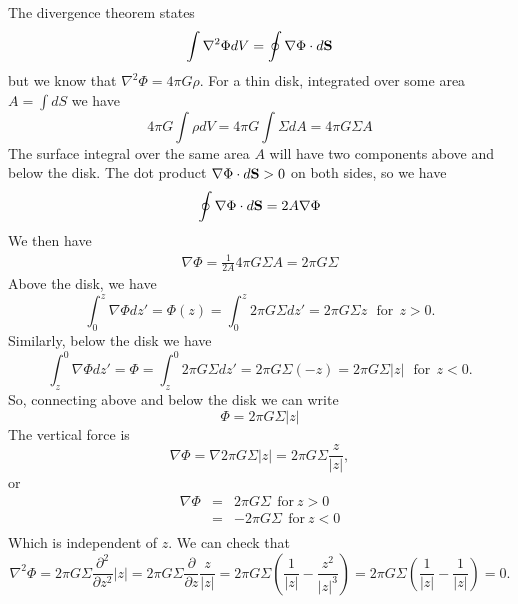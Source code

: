 \documentclass[]{article}
\begin{document}
The divergence theorem states
\begin{equation}
\int \nabla^2 \Phi dV = \oint \nabla \Phi \cdot d\mathbf{S}
\end{equation}
\noindent
but we know that $\nabla^2 \Phi = 4\pi G \rho$.
For a thin disk, integrated over some area $A = \int dS$ we have
\begin{equation}
4\pi G \int \rho dV = 4\pi G \int \Sigma dA = 4\pi G \Sigma A
\end{equation}
\noindent
The surface integral over the same area $A$ will have two
components above and below the disk.  The dot product
$\nabla \Phi \cdot d\mathbf{S}>0$ on both sides, so we have
\begin{equation}
\oint \nabla \Phi \cdot d\vS = 2 A \nabla \Phi %
\end{equation}
\noindent
We then have
\begin{eqnarray}
\nabla \Phi = \frac{1}{2A} 4 \pi G \Sigma A = 2\pi G \Sigma
\end{eqnarray}
\noindent
Above the disk, we have
\begin{equation}
\int_0^{z} \nabla \Phi dz' = \Phi(z) = \int_{0}^{z} 2\pi G \Sigma dz' = 2\pi G \Sigma z~~~\mathrm{for}~~z>0.
\end{equation}
Similarly, below the disk we have
\begin{equation}
\int_{z}^{0} \nabla \Phi dz' = \Phi = \int_{z}^{0} 2\pi G \Sigma dz' = 2\pi G \Sigma (-z) =2\pi G \Sigma|z|  ~~~\mathrm{for}~~z<0.
\end{equation}
\noindent
So, connecting above and below the disk we can write
\begin{equation}
\Phi = 2\pi G \Sigma|z| 
\end{equation}
\noindent
The vertical force is
\begin{equation}
\nabla \Phi = \nabla 2\pi G \Sigma|z| = 2 \pi G \Sigma \frac{z}{|z|},
\end{equation}
\noindent
or
\begin{eqnarray}
\nabla \Phi &=& 2\pi G \Sigma~~\mathrm{for}~z>0\\
&=& -2\pi G \Sigma~~\mathrm{for}~z<0\\
\end{eqnarray}
\noindent
Which is independent of $z$.
\noindent
We can check that
\begin{equation}
\nabla^2 \Phi = 2\pi G \Sigma \frac{\partial^2}{\partial z^2}|z| = 2\pi G \Sigma \frac{\partial}{\partial z}\frac{z}{|z|} = 2\pi G \Sigma \left(\frac{1}{|z|} - \frac{z^2}{|z|^3} \right) =  2\pi G \Sigma \left(\frac{1}{|z|} - \frac{1}{|z|} \right) = 0.
\end{equation}
\end{document}
